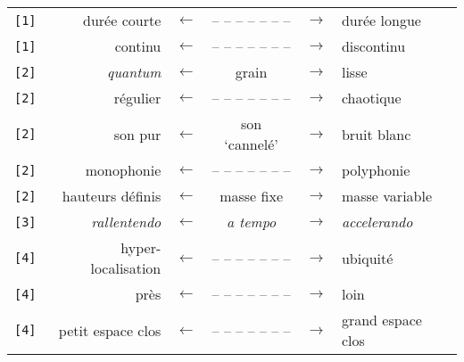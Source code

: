\documentclass{article}
\begin{document}
\begin{longtable}{lrcccl}
\texttt{[1]} & durée courte & $\leftarrow$ & -- -- -- -- -- -- -- & $\rightarrow$ & durée longue \\
\texttt{[1]} & continu & $\leftarrow$ & -- -- -- -- -- -- -- & $\rightarrow$ & discontinu \\
\texttt{[2]} & \textit{quantum} & $\leftarrow$ & grain & $\rightarrow$ & lisse \\
\texttt{[2]} & régulier & $\leftarrow$ & -- -- -- -- -- -- -- & $\rightarrow$ & chaotique \\
\texttt{[2]} & son pur & $\leftarrow$ & son `cannelé' & $\rightarrow$ & bruit blanc \\
\texttt{[2]} & monophonie & $\leftarrow$ & -- -- -- -- -- -- -- & $\rightarrow$ & polyphonie \\
\texttt{[2]} & hauteurs définis & $\leftarrow$ & masse fixe & $\rightarrow$ & masse variable \\
\texttt{[3]} & \textit{rallentendo} & $\leftarrow$ & \textit{a tempo} & $\rightarrow$ & \textit{accelerando} \\
\texttt{[4]} & hyper-localisation & $\leftarrow$ & -- -- -- -- -- -- -- & $\rightarrow$ & ubiquité \\
\texttt{[4]} & près & $\leftarrow$ & -- -- -- -- -- -- -- & $\rightarrow$ & loin \\
\texttt{[4]} & petit espace clos & $\leftarrow$ & -- -- -- -- -- -- -- & $\rightarrow$ & grand espace clos \\
\end{longtable}



\bigskip

%
\end{document}
